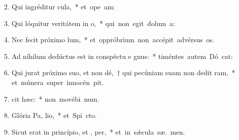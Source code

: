 \begin{flushleft}
\begin{enumerate}[leftmargin=*]
\setcounter{enumi}{1}

\item Qui ingréditur  cula,~* \mbox{et ope am:}
\item Qui lóquitur veritátem in  o,~* \mbox{qui non egit dolum   a:}
\item Nec fecit próximo  lum,~* \mbox{et oppróbrium non accépit advérsus  os.}
\item Ad níhilum dedúctus est in conspéctu e gnus:~* \mbox{timéntes autem Dó cat:}
\item Qui jurat próximo suo, et non dé,~† qui pecúniam suam non dedit  ram,~* \mbox{et múnera super innocén  pit.}
\item {} cit hæc:~* \mbox{non movébi  num.}
\item Glória Pa,  lio,~* \mbox{et Spi cto.}
\item Sicut erat in princípio, et ,  per,~* \mbox{et in s\'{\ae}cula sæ. men.}

\end{enumerate}
\end{flushleft}


